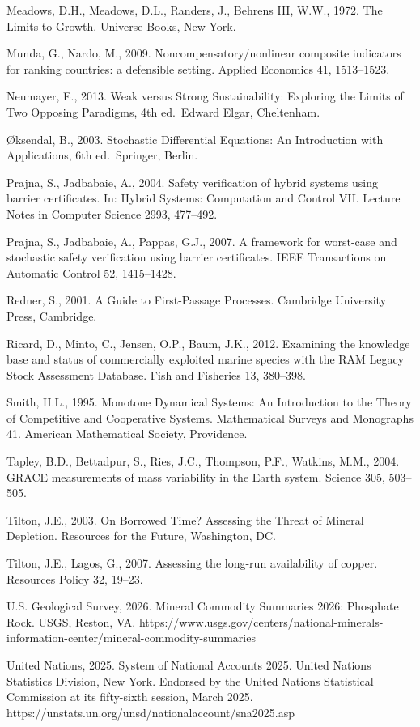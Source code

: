 \documentclass[11pt]{article}
\begin{document}
Meadows, D.H., Meadows, D.L., Randers, J., Behrens III, W.W., 1972. The
Limits to Growth. Universe Books, New York.

Munda, G., Nardo, M., 2009. Noncompensatory/nonlinear composite
indicators for ranking countries: a defensible setting. Applied
Economics 41, 1513--1523.

Neumayer, E., 2013. Weak versus Strong Sustainability: Exploring the
Limits of Two Opposing Paradigms, 4th ed.~Edward Elgar, Cheltenham.

\O{}ksendal, B., 2003. Stochastic Differential Equations: An Introduction
with Applications, 6th ed.~Springer, Berlin.

Prajna, S., Jadbabaie, A., 2004. Safety verification of hybrid systems using barrier certificates. In: Hybrid Systems: Computation and Control VII. Lecture Notes in Computer Science 2993, 477--492.

Prajna, S., Jadbabaie, A., Pappas, G.J., 2007. A framework for worst-case and stochastic safety verification using barrier certificates. IEEE Transactions on Automatic Control 52, 1415--1428.

Redner, S., 2001. A Guide to First-Passage Processes. Cambridge
University Press, Cambridge.

Ricard, D., Minto, C., Jensen, O.P., Baum, J.K., 2012. Examining the
knowledge base and status of commercially exploited marine species with
the RAM Legacy Stock Assessment Database. Fish and Fisheries 13,
380--398.

Smith, H.L., 1995. Monotone Dynamical Systems: An Introduction to the Theory of Competitive and Cooperative Systems. Mathematical Surveys and Monographs 41. American Mathematical Society, Providence.

Tapley, B.D., Bettadpur, S., Ries, J.C., Thompson, P.F., Watkins, M.M.,
2004. GRACE measurements of mass variability in the Earth system.
Science 305, 503--505.

Tilton, J.E., 2003. On Borrowed Time? Assessing the Threat of Mineral
Depletion. Resources for the Future, Washington, DC.

Tilton, J.E., Lagos, G., 2007. Assessing the long-run availability of
copper. Resources Policy 32, 19--23.

U.S. Geological Survey, 2026. Mineral Commodity Summaries 2026:
Phosphate Rock. USGS, Reston, VA.
https://www.usgs.gov/centers/national-minerals-information-center/mineral-commodity-summaries

United Nations, 2025. System of National Accounts 2025. United Nations Statistics Division, New York. Endorsed by the United Nations Statistical Commission at its fifty-sixth session, March 2025. https://unstats.un.org/unsd/nationalaccount/sna2025.asp
\end{document}
